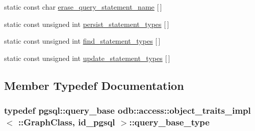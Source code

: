 \begin{DoxyCompactItemize}
\item 
static const char \hyperlink{classodb_1_1access_1_1object__traits__impl_3_01_1_1_graph_class_00_01id__pgsql_01_4_a1b28ef70d0dd05ec741086ea4e9fa322}{erase\+\_\+query\+\_\+statement\+\_\+name} \mbox{[}$\,$\mbox{]}
\item 
static const unsigned int \hyperlink{classodb_1_1access_1_1object__traits__impl_3_01_1_1_graph_class_00_01id__pgsql_01_4_ab04356c6ba62e2762e6f6e5b042b5b87}{persist\+\_\+statement\+\_\+types} \mbox{[}$\,$\mbox{]}
\item 
static const unsigned int \hyperlink{classodb_1_1access_1_1object__traits__impl_3_01_1_1_graph_class_00_01id__pgsql_01_4_acdf0b1618ce770c1a4f5d506c8ba7233}{find\+\_\+statement\+\_\+types} \mbox{[}$\,$\mbox{]}
\item 
static const unsigned int \hyperlink{classodb_1_1access_1_1object__traits__impl_3_01_1_1_graph_class_00_01id__pgsql_01_4_ac51df20eb0831504e95bc3b298e9b271}{update\+\_\+statement\+\_\+types} \mbox{[}$\,$\mbox{]}
\end{DoxyCompactItemize}


\subsection{Member Typedef Documentation}
\hypertarget{classodb_1_1access_1_1object__traits__impl_3_01_1_1_graph_class_00_01id__pgsql_01_4_a0e7e103445edf90aacb32050128dbe2d}{}
\subsubsection[{query\+\_\+base\+\_\+type}]{\setlength{\rightskip}{0pt plus 5cm}typedef pgsql\+::query\+\_\+base odb\+::access\+::object\+\_\+traits\+\_\+impl$<$ \+::{\bf Graph\+Class}, id\+\_\+pgsql $>$\+::{\bf query\+\_\+base\+\_\+type}}\label{classodb_1_1access_1_1object__traits__impl_3_01_1_1_graph_class_00_01id__pgsql_01_4_a0e7e103445edf90aacb32050128dbe2d}
\hypertarget{classodb_1_1access_1_1object__traits__impl_3_01_1_1_graph_class_00_01id__pgsql_01_4_a922126b901bf80b4f4fcae57bed9cb6a}{}
